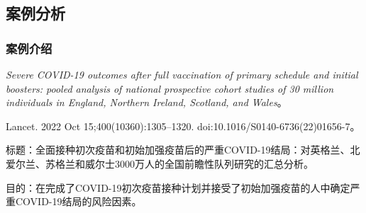 \subsection{案例分析}
\subsubsection{案例介绍}
\textit{Severe COVID-19 outcomes after full vaccination of primary schedule and initial boosters: pooled analysis of national prospective cohort studies of 30 million individuals in England, Northern Ireland, Scotland, and Wales}。

Lancet. 2022 Oct 15;400(10360):1305--1320. doi:10.1016/S0140-6736(22)01656-7。

标题：全面接种初次疫苗和初始加强疫苗后的严重COVID-19结局：对英格兰、北爱尔兰、苏格兰和威尔士3000万人的全国前瞻性队列研究的汇总分析。

目的：在完成了COVID-19初次疫苗接种计划并接受了初始加强疫苗的人中确定严重COVID-19结局的风险因素。
